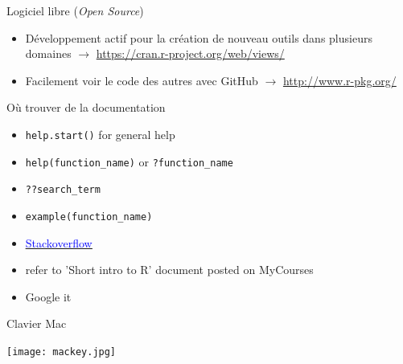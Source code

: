 \documentclass[11pt]{beamer}\usepackage[]{graphicx}\usepackage[]{color}
\begin{document}
\begin{frame}{Logiciel libre (\textit{Open Source})}

\begin{itemize}
  \setlength\itemsep{2em}
\item D\'{e}veloppement actif pour la cr\'{e}ation de nouveau outils dans plusieurs domaines $\rightarrow$ \href{https://cran.r-project.org/web/views/}{https://cran.r-project.org/web/views/} 
\item Facilement voir le code des autres avec GitHub $\rightarrow$ \href{http://www.r-pkg.org/}{http://www.r-pkg.org/}
\end{itemize}


\end{frame}






\begin{frame}{O\`{u} trouver de la documentation}
\begin{itemize}
\item \texttt{help.start()} for general help
\item \texttt{help(function\_name)} or \texttt{?function\_name}
\item \texttt{??search\_term}
\item \texttt{example(function\_name)}
\item  \href{http://stackoverflow.com/questions/tagged/r}{\underline{\textcolor{blue}{Stackoverflow}}}
\item refer to 'Short intro to R' document posted on MyCourses
\item Google it
\end{itemize}
\end{frame}


\begin{frame}{Clavier Mac}

\vspace{0.1in}

\begin{center}
\texttt{[image: mackey.jpg]}
\end{center}

\end{frame}
\end{document}
